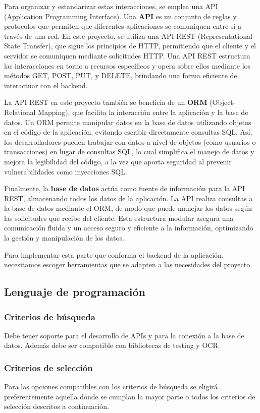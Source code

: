 Para organizar y estandarizar estas interacciones, se emplea una API (Application Programming Interface). Una \textbf{API} es un conjunto de reglas y protocolos que permiten que diferentes aplicaciones se comuniquen entre sí a través de una red. En este proyecto, se utiliza una API REST (Representational State Transfer), que sigue los principios de HTTP, permitiendo que el cliente y el servidor se comuniquen mediante solicitudes HTTP. Una API REST estructura las interacciones en torno a recursos específicos y opera sobre ellos mediante los métodos GET, POST, PUT, y DELETE, brindando una forma eficiente de interactuar con el backend.

La API REST en este proyecto también se beneficia de un \textbf{ORM} (Object-Relational Mapping), que facilita la interacción entre la aplicación y la base de datos. Un ORM permite manipular datos en la base de datos utilizando objetos en el código de la aplicación, evitando escribir directamente consultas SQL. Así, los desarrolladores pueden trabajar con datos a nivel de objetos (como usuarios o transacciones) en lugar de consultas SQL, lo cual simplifica el manejo de datos y mejora la legibilidad del código, a la vez que aporta seguridad al prevenir vulnerabilidades como inyecciones SQL.

Finalmente, la \textbf{base de datos} actúa como fuente de información para la API REST, almacenando todos los datos de la aplicación. La API realiza consultas a la base de datos mediante el ORM, de modo que puede manejar los datos según las solicitudes que recibe del cliente. Esta estructura modular asegura una comunicación fluida y un acceso seguro y eficiente a la información, optimizando la gestión y manipulación de los datos.

Para implementar esta parte que conforma el backend de la aplicación, necesitamos escoger herramientas que se adapten a las necesidades del proyecto.

\subsection{Lenguaje de programación}
\subsubsection{Criterios de búsqueda}
Debe tener soporte para el desarrollo de APIs y para la conexión a la base de datos. Además debe ser compatible con bibliotecas de testing y OCR.

\subsubsection{Criterios de selección}
Para las opciones compatibles con los criterios de búsqueda se eligirá preferentemente aquella donde se cumplan la mayor parte o todos los criterios de selección descritos a continuación.

